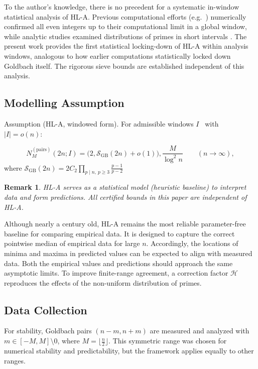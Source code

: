 \documentclass[11pt]{article}
\theoremstyle{inline}
\newtheorem*{remark}{Remark}
\theoremstyle{break}
\theoremstyle{break}
\theoremstyle{break}
\theoremstyle{break}
\theoremstyle{break}
\theoremstyle{break}
\theoremstyle{break}
\theoremstyle{inline}
\newcommand{\SGB}{\mathcal{S}_{\scriptscriptstyle\mathrm{GB}}}
\newcommand{\HLCorr}{\mathcal{H}}
\begin{document}
To the author’s knowledge, there is no precedent for a systematic in-window statistical analysis of HL-A.  Previous computational efforts (e.g.~\cite{OliveiraESilva2014}) numerically confirmed all even integers up to their computational limit in a global window, while analytic studies examined distributions of primes in short intervals \cite{MontgomerySoundararajan2004,GranvilleSoundararajan2007}.  The present work provides the first statistical locking-down of HL-A within analysis windows, analogous to how earlier computations statistically locked down Goldbach itself.  The rigorous sieve bounds are established independent of this analysis.

\subsection{Modelling Assumption}
Assumption (HL-A, windowed form). For admissible windows \( I \)  with \( \lvert I \rvert = o(n) \):

\begin{equation}
N_M^{(\mathrm{pairs})}(2n;I)  = \Big(2,\SGB(2n) + o(1)\Big),\frac{M}{\log^2 n}
\qquad(n\to\infty),
\end{equation}
where \( \SGB(2n) = 2C_2\prod_{p\mid n,\ p\ge3} \frac{p-1}{p-2} \)

\begin{remark}
HL-A serves as a statistical model (heuristic baseline) to interpret data and form predictions. All certified bounds in this paper are independent of HL-A.
\end{remark}

Although nearly a century old, HL-A remains the most reliable parameter-free baseline for comparing empirical data. It is designed to capture the correct pointwise median of empirical data for large \( n \). Accordingly, the locations of minima and maxima in predicted values can be expected to align with measured data. Both the empirical values and predictions should approach the same asymptotic limits. To improve finite-range agreement, a correction factor \( \HLCorr \) reproduces the effects of the non-uniform distribution of primes.


\subsection{Data Collection}

For stability, Goldbach pairs \( (n-m, n+m) \) are measured and analyzed with \( m \in [-M,M] \setminus{0} \), where \( M=\lfloor \frac{n}{2} \rfloor \). This symmetric range was chosen for numerical stability and predictability, but the framework applies equally to other ranges.
\end{document}
